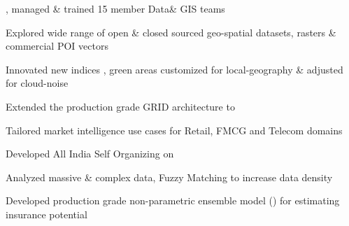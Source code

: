 \documentclass[]{deedy-resume-openfont}
\begin{document}
\begin{minipage}[t]{0.66\textwidth}
\sectionsep

\begin{tightemize}
\item {}, managed \& trained 15 member Data\& GIS teams
\item Explored wide range of open \& closed sourced geo-spatial datasets,  rasters \& commercial POI vectors
\item Innovated new indices , green areas customized for local-geography \& adjusted for cloud-noise
\item Extended the production grade GRID architecture to 
\item Tailored market intelligence use cases for Retail, FMCG and Telecom domains
\item Developed All India Self Organizing  on 

%
\end{tightemize}
\sectionsep


\begin{tightemize}
\item Analyzed massive \& complex data, Fuzzy Matching  to increase data density
\item Developed production grade non-parametric ensemble model () for estimating insurance potential
\end{tightemize}
\sectionsep


\end{minipage}
\end{document}
